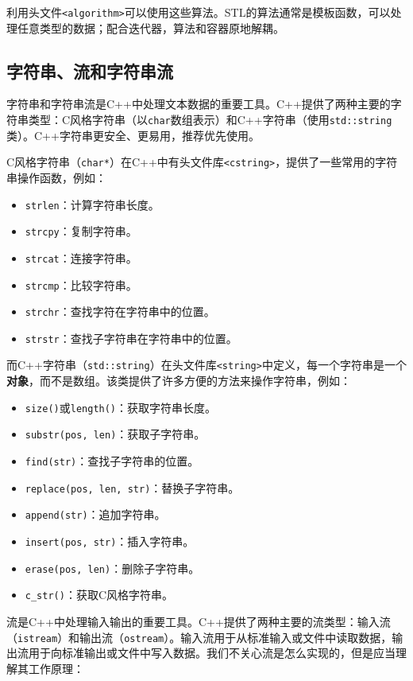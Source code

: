 \documentclass[../main.tex]{subfiles}
\begin{document}
利用头文件\texttt{<algorithm>}可以使用这些算法。STL的算法通常是模板函数，可以处理任意类型的数据；配合迭代器，算法和容器原地解耦。

\subsection{字符串、流和字符串流}

字符串和字符串流是C++中处理文本数据的重要工具。C++提供了两种主要的字符串类型：C风格字符串（以\texttt{char}数组表示）和C++字符串（使用\texttt{std::string}类）。C++字符串更安全、更易用，推荐优先使用。

C风格字符串（\texttt{char*}）在C++中有头文件库\texttt{<cstring>}，提供了一些常用的字符串操作函数，例如：
\begin{itemize}
  \item \texttt{strlen}：计算字符串长度。
  \item \texttt{strcpy}：复制字符串。
  \item \texttt{strcat}：连接字符串。
  \item \texttt{strcmp}：比较字符串。
  \item \texttt{strchr}：查找字符在字符串中的位置。
  \item \texttt{strstr}：查找子字符串在字符串中的位置。
\end{itemize}

而C++字符串（\texttt{std::string}）在头文件库\texttt{<string>}中定义，每一个字符串是一个\textbf{对象}，而不是数组。该类提供了许多方便的方法来操作字符串，例如：
\begin{itemize}
  \item \texttt{size()}或\texttt{length()}：获取字符串长度。
  \item \texttt{substr(pos, len)}：获取子字符串。
  \item \texttt{find(str)}：查找子字符串的位置。
  \item \texttt{replace(pos, len, str)}：替换子字符串。
  \item \texttt{append(str)}：追加字符串。
  \item \texttt{insert(pos, str)}：插入字符串。
  \item \texttt{erase(pos, len)}：删除子字符串。
  \item \texttt{c\_str()}：获取C风格字符串。
\end{itemize}

流是C++中处理输入输出的重要工具。C++提供了两种主要的流类型：输入流（\texttt{istream}）和输出流（\texttt{ostream}）。输入流用于从标准输入或文件中读取数据，输出流用于向标准输出或文件中写入数据。我们不关心流是怎么实现的，但是应当理解其工作原理：
\end{document}

